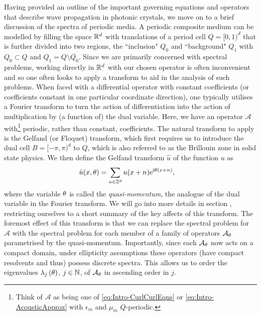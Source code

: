 Having provided an outline of the important governing equations and operators that describe wave propagation in photonic crystals, we move on to a brief discussion of the spectra of periodic media.
A periodic composite medium can be modelled by filling the space $\mathbb{R}^d$ with translations of a period cell $Q=[0,1)^d$ that is further divided into two regions, the ``inclusion" $Q_0$ and ``background" $Q_1$ with $Q_0\subset Q$ and $Q_1=Q\setminus\overline{Q_0}$.
Since we are primarily concerned with spectral problems, working directly in $\mathbb{R}^d$ with our chosen operator is often inconvenient  and so one often looks to apply a transform to aid in the analysis of such problems.
When faced with a differential operator with constant coefficients (or coefficients constant in one particular coordinate direction), one typically utilises a Fourier transform to turn the action of differentiation into the action of multiplication by (a function of) the dual variable.
Here, we have an operator $\mathcal{A}$ with\footnote{Think of $\mathcal{A}$ as being one of \eqref{eq:Intro-CurlCurlEqns} or \eqref{eq:Intro-AcousticApprox} with $\epsilon_m$ and $\mu_m$ $Q$-periodic.} periodic, rather than constant, coefficients.
The natural transform to apply is the Gelfand (or Floquet) transform, which first requires us to introduce the dual cell $B=[-\pi,\pi)^d$ to $Q$, which is also referred to as the Brillouin zone in solid state physics.
We then define the Gelfand transform $\hat{u}$ of the function $u$ as 
\begin{align*}
	\hat{u}(x, \theta) &= \sum_{n\in\mathbb{Z}^d} u(x+n)\mathrm{e}^{\mathrm{i}\theta(x+n)},
\end{align*}
where the variable $\theta$ is called the \emph{quasi-momentum}, the analogue of the dual variable in the Fourier transform.
We will go into more details in section , restricting ourselves to a short summary of the key affects of this transform.
The foremost effect of this transform is that we can replace the spectral problem for $\mathcal{A}$ with the spectral problem for each member of a family of operators $\mathcal{A}_{\theta}$ parametrised by the quasi-momentum.
Importantly, since each $\mathcal{A}_{\theta}$ now acts on a compact domain, under ellipticity assumptions these operators (have compact resolvents and thus) possess discrete spectra.
This allows us to order the eigenvalues $\lambda_j\left( \theta \right)$, $j\in\mathbb{N}$, of $\mathcal{A}_{\theta}$ in ascending order in $j$.
